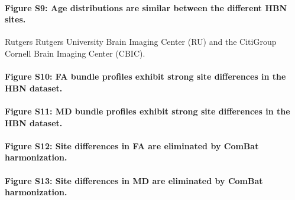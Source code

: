 \documentclass[10pt,letterpaper]{article}
\begin{document}
\paragraph*{Figure S9: Age distributions are similar between the different
HBN sites.} Rutgers Rutgers University Brain Imaging Center (RU) and the CitiGroup Cornell Brain Imaging Center (CBIC).

\paragraph*{Figure S10: FA bundle profiles exhibit strong site differences in the HBN dataset.}

\paragraph*{Figure S11: MD bundle profiles exhibit strong site differences in the HBN dataset.}

\paragraph*{Figure S12: Site differences in FA are eliminated by ComBat harmonization.}

\paragraph*{Figure S13: Site differences in MD are eliminated by ComBat harmonization.}
\end{document}
